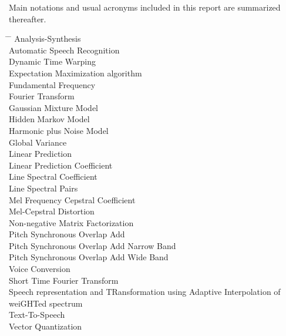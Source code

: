 Main notations and usual acronyms included in this report are summarized thereafter. \\

\begin{tabbing}
\hspace{3cm} \= \hspace{3cm} \= \kill
{} \> Analysis-Synthesis\\
 \> Automatic Speech Recognition\\
 \> Dynamic Time Warping\\
 \> Expectation Maximization algorithm \\
 \> Fundamental Frequency\\
 \> Fourier Transform\\
 \> Gaussian Mixture Model \\
 \> Hidden Markov Model\\
 \> Harmonic plus Noise Model\\
 \> Global Variance\\
 \> Linear Prediction\\
 \> Linear Prediction Coefficient\\
 \> Line Spectral Coefficient\\
 \> Line Spectral Pairs\\
 \> Mel Frequency Cepstral Coefficient\\
 \> Mel-Cepstral Distortion\\
 \> Non-negative Matrix Factorization\\
 \> Pitch Synchronous Overlap Add\\
 \> Pitch Synchronous Overlap Add Narrow Band\\
 \> Pitch Synchronous Overlap Add Wide Band\\
 \> Voice Conversion\\
 \> Short Time Fourier Transform\\
 \> Speech representation and TRansformation using Adaptive Interpolation of weiGHTed spectrum\\
 \> Text-To-Speech\\
 \> Vector Quantization\\
\end{tabbing}



